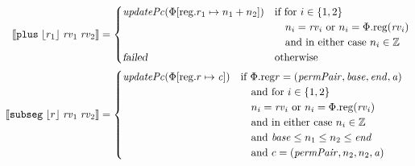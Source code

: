 \documentclass[a4paper]{article}
\newcommand{\update}[2]{[#1 \mapsto #2]}
\newcommand{\sem}[1]{\left\llbracket #1 \right\rrbracket}
\newcommand{\var}[1]{\mathit{#1}}
\newcommand{\rv}{\var{rv}}
\newcommand{\gl}{\var{g}}
\newcommand{\addr}{\var{a}}
\newcommand{\start}{\var{base}}
\newcommand{\addrend}{\var{end}}
\newcommand{\perm}{\var{perm}}
\newcommand{\permp}{\var{permPair}}
\newcommand{\stdcap}[1][(\perm,\gl)]{\left(#1,\start,\addrend,\addr \right)}
\newcommand{\plainproj}[1]{\mathrm{#1}}
\newcommand{\memreg}[1][\Phi]{#1.\plainproj{reg}}
\newcommand{\updateReg}[3][\Phi]{#1\update{\plainproj{reg}.#2}{#3}}
\newcommand{\failed}{\textsl{failed}}
\newcommand{\plainfun}[2]{
  \ifthenelse{\equal{#2}{}}
             {\mathit{#1}}
             {\mathit{#1}(#2)}
}
\newcommand{\stdUpdatePc}[1]{\plainfun{updatePc}{#1}}
\newcommand{\ints}{\mathbb{Z}}
\newcommand{\refreg}[1]{\lfloor #1 \rfloor}
\newcommand{\zinstr}[1]{\mathtt{#1}}
\newcommand{\threeinstr}[4]{\zinstr{#1} \; #2 \; #3 \; #4}
\newcommand{\subseg}[3]{\threeinstr{subseg}{#1}{#2}{#3}}
\newcommand{\plus}[3]{\threeinstr{plus}{#1}{#2}{#3}}
\begin{document}
\begin{align*}
  \sem{\plus{\refreg{r_1}}{\rv_1}{\rv_2}}               & =
                                                          \begin{cases}
                                                            \stdUpdatePc{\updateReg{r_1}{n_1+n_2}} &
                                                            \arraycolsep=0pt
                                                            \begin{array}[t]{l}
                                                              \text{if for $i \in \{1,2\}$}\\
                                                              \quad\text{$n_i = \rv_i$ or $n_i = \memreg(\rv_i)$}\\
                                                              \quad\text{and in either case $n_i \in \ints$}
                                                            \end{array}\\
                                                            \failed & \text{otherwise}
                                                          \end{cases}\\
  \sem{\subseg{\refreg{r}}{\rv_1}{\rv_2}} & = 
                                            \begin{cases}
                                              \stdUpdatePc{\updateReg{r}{\var{c}}} &
                                              \arraycolsep=0pt
                                              \begin{array}[t]{l}
                                                \text{if $\memreg{r} = \stdcap[\permp]$} \\
                                                \quad\text{and for $i \in \{1,2\}$}\\
                                                \quad\text{$n_i = \rv_i$ or $n_i = \memreg(\rv_i)$}\\
                                                \quad\text{and in either case $n_i \in \ints$}\\
                                                \quad\text{and $\start \leq n_1 \leq n_2 \leq \addrend$}\\
                                                \quad\text{and $c = (\permp,n_2,n_2,\addr)$}
                                              \end{array} \\

\end{cases}
\end{align*}
\end{document}
